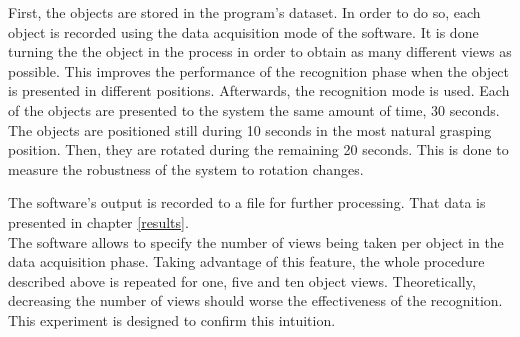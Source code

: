 

		First, the objects are stored in the program's dataset. 
		In order to do so, each object is recorded using the data acquisition mode of the software. 
		It is done turning the the object in the process in order to obtain as many different views as possible. 
		This improves the performance of the recognition phase when the object is presented in different positions. 
		Afterwards, the recognition mode is used.
		Each of the objects are presented to the system the same amount of time, 30 seconds. 
		The objects are positioned still during 10 seconds in the most natural grasping position. 
		Then, they are rotated during the remaining 20 seconds. 
		This is done to measure the robustness of the system to rotation changes. 

		The software's output is recorded to a file for further processing. 
		That data is presented in chapter \ref{results}.
		\\

		The software allows to specify the number of views being taken per object in the data acquisition phase. 
		Taking advantage of this feature, the whole procedure described above is repeated for one, five and ten object views.
		Theoretically, decreasing the number of views should worse the effectiveness of the recognition. %
		This experiment is designed to confirm this intuition. 
		\\%






